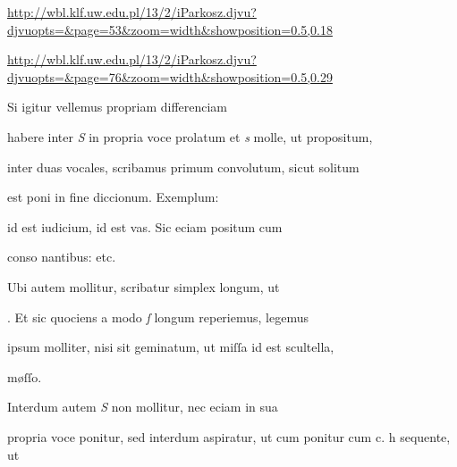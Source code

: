 
\newParkoszpage

{
\url{http://wbl.klf.uw.edu.pl/13/2/iParkosz.djvu?djvuopts=&page=53&zoom=width&showposition=0.5,0.18}

\url{http://wbl.klf.uw.edu.pl/13/2/iParkosz.djvu?djvuopts=&page=76&zoom=width&showposition=0.5,0.29}
}

\bigskip

\obeylines
\mono



\fullpreviouslines


{
\color{blue}



\indentK Si igitur vellemus propriam differenciam 

\fulllines

habere inter \textit{S} in propria voce prolatum et \textit{s} molle, ut propositum,
}


\fulllines

inter duas vocales, scribamus primum convolutum, sicut solitum 

est poni in fine diccionum. Exemplum:    

 id est iudicium,  id est vas. Sic eciam positum cum 

conso nantibus:      etc. 

Ubi autem mollitur, scribatur simplex longum, ut 

. Et sic quociens a modo \textit{ſ} longum reperiemus, legemus

ipsum molliter, nisi sit geminatum, ut miſſa id est scultella,

\splitlines

møſſo.

\indentK Interdum autem \textit{S} non mollitur, nec eciam in sua

\fulllines

propria voce ponitur, sed interdum aspiratur, ut cum ponitur cum 
 c. h sequente, ut   

\splitlines

